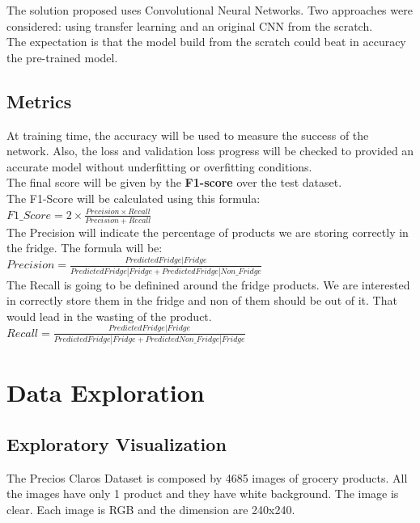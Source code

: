 \documentclass[a4paper,10pt]{article}
\begin{document}
The solution proposed uses Convolutional Neural Networks. Two approaches were considered: using transfer learning and an original CNN from the scratch.\\

The expectation is that the model build from the scratch could beat in accuracy the pre-trained model.\\

\subsection{Metrics}

At training time, the accuracy will be used to measure the success of the network. Also, the loss and validation loss progress will be checked to provided an accurate model without underfitting or overfitting conditions.\\

The final score will be given by the \textbf{F1-score} over the test dataset. \\

The F1-Score will be calculated using this formula: \\

$F1\_Score = 2 \times \frac{Precision \times Recall}{Precision+Recall}$ \\

The Precision will indicate the percentage of products we are storing correctly in the fridge. The formula will be: \\

$Precision = \frac{Predicted Fridge|Fridge}{Predicted Fridge|Fridge+Predicted Fridge|Non\_Fridge}$ \\

The Recall is going to be definined around the fridge products. We are interested in correctly store them in the fridge and non of them should be out of it. That would lead in the wasting of the product. \\

$Recall = \frac{Predicted Fridge|Fridge}{Predicted Fridge|Fridge+Predicted Non\_Fridge|Fridge}$ \\


\section{Data Exploration}

\subsection{Exploratory Visualization}
The Precios Claros Dataset is composed by 4685 images of grocery products. All the images have only 1 product and they have white background. The image is clear.  Each image is RGB and the dimension are 240x240. \\
\end{document}
